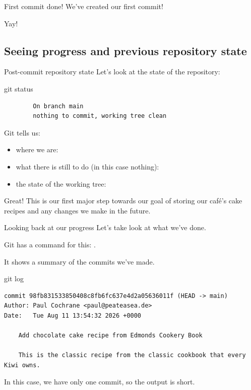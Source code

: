 \begin{frame}[fragile]{First commit done!}
    We've created our first commit!

    Yay!  
\end{frame}

\subsection{Seeing progress and previous repository state}

\begin{frame}[fragile]{Post-commit repository state}
    Let's look at the state of the repository:
    \begin{shellcode}
        git status
    \end{shellcode}
    \begin{verbatim}
        On branch main
        nothing to commit, working tree clean
    \end{verbatim}
    Git tells us:
    \begin{itemize}
        \item where we are: 
        \item what there is still to do (in this case nothing):
        \item the state of the working tree: 
    \end{itemize}

    Great!  This is our first major step towards our goal of storing our
    café's cake recipes and any changes we make in the future.
\end{frame}

\begin{frame}[fragile]{Looking back at our progress}
    Let's take look at what we've done.

    Git has a command for this: .

    It shows a summary of the commits we've made.

    \begin{shellcode}
        git log
    \end{shellcode}
    \begin{verbatim}
commit 98fb831533850408c8fb6fc637e4d2a05636011f (HEAD -> main)
Author: Paul Cochrane <paul@peateasea.de>
Date:   Tue Aug 11 13:54:32 2026 +0000

    Add chocolate cake recipe from Edmonds Cookery Book

    This is the classic recipe from the classic cookbook that every Kiwi owns.
    \end{verbatim}

    In this case, we have only one commit, so the output is short.
\end{frame}

